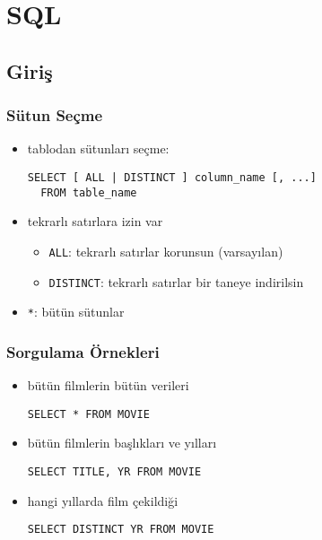 \documentclass[dvipsnames]{beamer}
\theoremstyle{plain}
\begin{document}
\lstset{language=FullSQL}

\section{SQL}

\subsection{Giriş}

\begin{frame}[fragile]
  \frametitle{Sütun Seçme}
  
  \begin{itemize}
    \item tablodan sütunları seçme:
    \begin{lstlisting}
SELECT [ ALL | DISTINCT ] column_name [, ...]
  FROM table_name
    \end{lstlisting}

    \pause
    \medskip
    
    \item tekrarlı satırlara izin var
    \begin{itemize}
        \item \lstinline!ALL!: tekrarlı satırlar korunsun (varsayılan)
        \item \lstinline!DISTINCT!: tekrarlı satırlar bir taneye indirilsin
    \end{itemize}

    \item \lstinline!*!: bütün sütunlar
  \end{itemize}
\end{frame}

\begin{frame}[fragile]
  \frametitle{Sorgulama Örnekleri}
  
  \begin{itemize}
  \item bütün filmlerin bütün verileri
    \begin{lstlisting}
SELECT * FROM MOVIE
    \end{lstlisting}

  \pause
  \item bütün filmlerin başlıkları ve yılları
    \begin{lstlisting}
SELECT TITLE, YR FROM MOVIE
    \end{lstlisting}

  \pause
  \item hangi yıllarda film çekildiği
    \begin{lstlisting}
SELECT DISTINCT YR FROM MOVIE
    \end{lstlisting}
  \end{itemize}
\end{frame}
\end{document}

